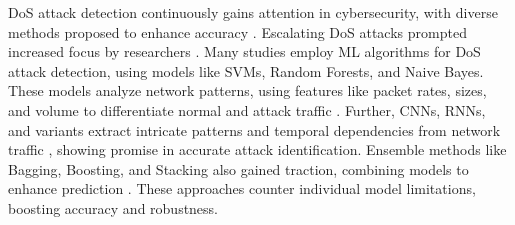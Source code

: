 
DoS attack detection continuously gains attention in cybersecurity, with diverse methods proposed to enhance accuracy \cite{zhijun2020low}. Escalating DoS attacks prompted increased focus by researchers \cite{david2021discriminating}. %
Many studies employ ML algorithms for DoS attack detection, using models like SVMs, Random Forests, and Naive Bayes. These models analyze network patterns, using features like packet rates, sizes, and volume to differentiate normal and attack traffic \cite{ali2023machine}. Further, CNNs, RNNs, and variants extract intricate patterns and temporal dependencies from network traffic \cite{mittal2022deep}, showing promise in accurate attack identification. Ensemble methods like Bagging, Boosting, and Stacking also gained traction, combining models to enhance prediction \cite{deepa2019design}. These approaches counter individual model limitations, boosting accuracy and robustness.


